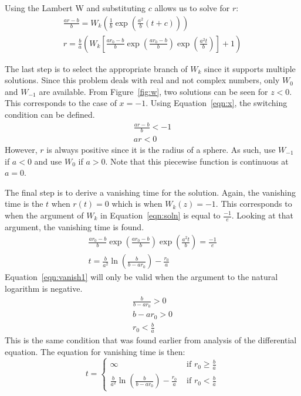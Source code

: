 \documentclass[journal]{IEEEtran}
\begin{document}
Using the Lambert W and substituting $c$ allows us to solve for $r$:
\begin{eqnarray}
  \frac{ar-b}{b} = W_k\left(\frac{1}{b}\exp\left(\frac{a^2}{b}(t+c)\right)\right) \\
  \label{eqn:soln}
  r = \frac{b}{a}\left(W_k\left[\frac{ar_0-b}{b} \exp\left(\frac{ar_0-b}{b}\right)\exp\left(\frac{a^2t}{b}\right)\right] + 1\right)
\end{eqnarray}

The last step is to select the appropriate branch of $W_k$ since it supports multiple solutions.
Since this problem deals with real and not complex numbers, only $W_0$ and $W_{-1}$ are available.
From Figure~\ref{fig:w}, two solutions can be seen for $z < 0$.
This corresponds to the case of $x = -1$.
Using Equation~\ref{eqn:x}, the switching condition can be defined.
\begin{eqnarray}
  \frac{ar-b}{b} < -1 \\
  ar < 0
\end{eqnarray}
However, $r$ is always positive since it is the radius of a sphere.
As such, use $W_{-1}$ if $a<0$ and use $W_0$ if $a>0$.
Note that this piecewise function is continuous at $a=0$.

The final step is to derive a vanishing time for the solution.
Again, the vanishing time is the $t$ when $r(t)=0$ which is when $W_k(z) = -1$.
This corresponds to when the argument of $W_k$ in Equation~\ref{eqn:soln} is equal to $\frac{-1}{e}$.
Looking at that argument, the vanishing time is found.
\begin{eqnarray}
  \frac{ar_0-b}{b} \exp\left(\frac{ar_0-b}{b}\right)\exp\left(\frac{a^2t}{b}\right) = \frac{-1}{e} \\
  \label{eqn:vanish1}
  t = \frac{b}{a^2} \ln\left(\frac{b}{b-ar_0}\right) - \frac{r_0}{a}
\end{eqnarray}
Equation~\ref{eqn:vanish1} will only be valid when the argument to the natural logarithm is negative.
\begin{eqnarray}
  \frac{b}{b-ar_0} > 0 \\
  b - ar_0 > 0 \\
  r_0 < \frac{b}{a}
\end{eqnarray}
This is the same condition that was found earlier from analysis of the differential equation.
The equation for vanishing time is then:
\begin{equation}
  \label{eqn:vanish}
  t = \left\{
    \begin{matrix}
      \infty & \text{ if } r_0 \geq \frac{b}{a} \\
      \frac{b}{a^2} \ln\left(\frac{b}{b-ar_0}\right) - \frac{r_0}{a} & \text{ if } r_0 < \frac{b}{a}
    \end{matrix}
  \right.
\end{equation}
\end{document}
